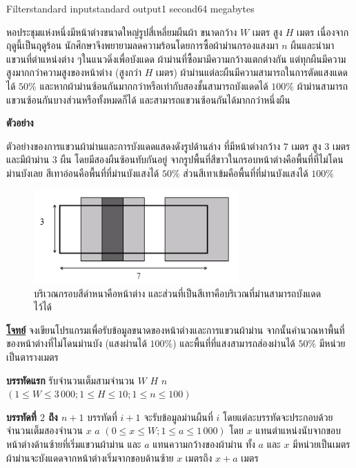 \documentclass[11pt,a4paper]{article}
\begin{document}
\begin{problem}{Filter}{standard input}{standard output}{1 second}{64 megabytes}

หอประชุมแห่งหนึ่งมีหน้าต่างขนาดใหญ่รูปสี่เหลี่ยมผืนผ้า ขนาดกว้าง $W$ เมตร สูง $H$ เมตร เนื่องจากฤดูนี้เป็นฤดูร้อน นักศึกษาจึงพยายามลดความร้อนโดยการซื้อผ้าม่านกรองแสงมา $n$ ผืนและนำมาแขวนที่ตำแหน่งต่าง ๆในแนวดิ่งเพื่อบังแดด ผ้าม่านที่ซื้อมามีความกว้างแตกต่างกัน แต่ทุกผืนมีความสูงมากกว่าความสูงของหน้าต่าง (สูงกว่า $H$ เมตร) ผ้าม่านแต่ละผืนมีความสามารถในการตัดแสงแดดได้ $50\%$ และหากผ้าม่านซ้อนกันมากกว่าหรือเท่ากับสองชั้นสามารถบังแดดได้ $100\%$ ผ้าม่านสามารถแขวนซ้อนกันบางส่วนหรือทั้งหมดก็ได้ และสามารถแขวนซ้อนกันได้มากกว่าหนึ่งผืน

\bigskip

\textbf{ตัวอย่าง}

ตัวอย่างของการแขวนผ้าม่านและการบังแดดแสดงดังรูปด้านล่าง ที่มีหน้าต่างกว้าง $7$ เมตร สูง $3$ เมตร และมีผ้าม่าน $3$ ผืน โดยมีสองผืนซ้อนทับกันอยู่ จากรูปพื้นที่สีขาวในกรอบหน้าต่างคือพื้นที่ที่ไม่โดนม่านบังเลย สีเทาอ่อนคือพื้นที่ที่ม่านบังแสงได้ $50\%$ ส่วนสีเทาเข้มคือพื้นที่ที่ม่านบังแสงได้ $100\%$ 

\begin{figure}[h]
\centering
\includegraphics[width=0.7\textwidth]{../latex/img/1014/1014-1.png}
\caption{บริเวณกรอบสีดำหนาคือหน้าต่าง และส่วนที่เป็นสีเทาคือบริเวณที่ม่านสามารถบังแดดไว้ได้}
\end{figure}
\bigskip
\underline{\textbf{โจทย์}}  จงเขียนโปรแกรมเพื่อรับข้อมูลขนาดของหน้าต่างและการแขวนผ้าม่าน จากนั้นคำนวณหาพื้นที่ของหน้าต่างที่ไม่โดนม่านบัง (แสงผ่านได้ $100\%$) และพื้นที่ที่แสงสามารถส่องผ่านได้ $50\%$ มีหน่วยเป็นตารางเมตร

\InputFile

\textbf{บรรทัดแรก} รับจำนวนเต็มสามจำนวน $W$ $H$ $n$ $(1\leq W\leq 3\,000; 1 \leq H\leq 10; 1\leq n\leq 100)$

\newpage

\textbf{บรรทัดที่ $2$ ถึง $n+1$ }บรรทัดที่ $i+1$ จะรับข้อมูลม่านผืนที่ $i$ โดยแต่ละบรรทัดจะประกอบด้วย จำนวนเต็มสองจำนวน $x$ $a$ $(0\leq x \leq W ; 1\leq a \leq 1\,000)$ โดย $x$ แทนตำแหน่งนับจากขอบหน้าต่างด้านซ้ายที่เริ่มแขวนผ้าม่าน และ $a$ แทนความกว้างของผ้าม่าน ทั้ง $a$ และ $x$ มีหน่วยเป็นเมตร ผ้าม่านจะบังแดดจากหน้าต่างเริ่มจากขอบด้านซ้าย $x$ เมตรถึง $x + a$ เมตร


\end{problem}
\end{document}
